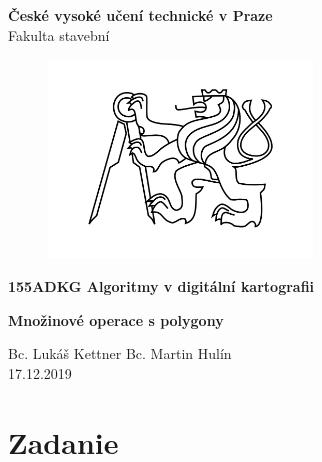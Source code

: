 \documentclass[12pt]{article}
\begin{document}
\begin{titlepage}
\centering
\Large \textbf{České vysoké učení technické v Praze }\\ Fakulta stavební
\vspace{2cm}

\begin{figure}[h!] %
\centering
\includegraphics[width=7cm]{./img/cvut.png}
\end{figure}
 
\Large \textbf{155ADKG Algoritmy v digitální kartografii}
\vspace{1cm}

\LARGE  \textbf{Množinové operace s polygony}
\vspace{3cm}

\Large Bc. Lukáš Kettner Bc. Martin Hulín \\ 17.12.2019

 \thispagestyle{empty} %
\end{titlepage}

\tableofcontents    %
\newpage %
\section{Zadanie}
\end{document}
